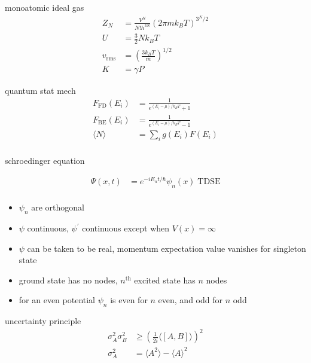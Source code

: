 \documentclass[avery5388, frame, grid]{flashcards}
\begin{document}
\begin{flashcard}{monoatomic ideal gas}
  {
    \begin{align*}
      Z_{N} &= \frac{V^{N}}{N! h^{3N}}(2 \pi m k_{B} T)^{3^{N}/2}\\
      U &= \frac{3}{2} N k_{B} T\\
      v_{\textrm{rms}} &= (\frac{3 k_{B} T}{m})^{1/2}\\
      K &= \gamma P
    \end{align*}
  }
\end{flashcard}

\begin{flashcard}{quantum stat mech}
  {
    \begin{align*}
      F_{\textrm{FD}}(E_{i}) &= \frac{1}{e^{(E_{i} - \mu) / k_{B} T} + 1}\\
      F_{\textrm{BE}}(E_{i}) &= \frac{1}{e^{(E_{i} - \mu) / k_{B} T} - 1}\\
      \langle N \rangle &= \sum_{i} g(E_{i}) F(E_{i})\\
    \end{align*}
  }
\end{flashcard}


\begin{flashcard}{schroedinger equation}
  {
    \begin{align*}
      \Psi(x, t) &= e^{-iE_{n}t/\hbar} \psi_{n}(x) \; \textrm{TDSE}\\
    \end{align*}
    
    \begin{itemize}
    \item $\psi_{n}$ are orthogonal
    \item $\psi$ continuous, $\psi^{'}$ continuous except when $V(x) = \infty$
    \item $\psi$ can be taken to be real, momentum expectation value vanishes for singleton state
    \item ground state has no nodes, $n^{\textrm{th}}$ excited state has $n$ nodes
    \item for an even potential $\psi_{n}$ is even for $n$ even, and odd for $n$ odd
    \end{itemize}
  }
\end{flashcard}

\begin{flashcard}{uncertainty principle}
  {
    \begin{align*}
      \sigma_{A}^{2} \sigma_{B}^{2} &\ge (\frac{1}{2i} \langle [A, B] \rangle)^{2}\\
      \sigma_{A}^{2} &= \langle A^{2} \rangle - {\langle A \rangle}^{2}
    \end{align*}
  }
\end{flashcard}
\end{document}
